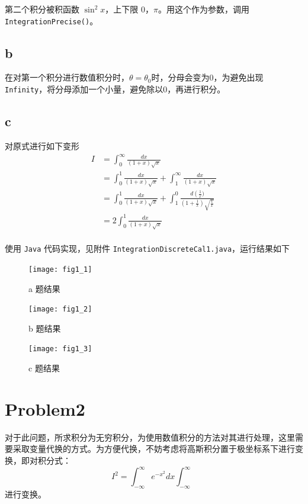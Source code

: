 \documentclass[UTF8]{ctexart}
\begin{document}
    第二个积分被积函数 \(\sin^2{x}\)，上下限 0，\(\pi\)。用这个作为参数，调用 \texttt{IntegrationPrecise()}。

    \subsection{b}\label{subsec:1.2}
    在对第一个积分进行数值积分时，\(\theta = \theta_0\)时，分母会变为0，为避免出现 \texttt{Infinity}，将分母添加一个小量，避免除以0，再进行积分。

    \subsection{c}\label{subsec:1.3}
    对原式进行如下变形
    \begin{equation*}
        \begin{align*}
            I & = \int_{0}^{\infty} \frac{dx}{(1 + x) \sqrt{x}} \\
              & = \int_{0}^{1} \frac{dx}{(1 + x) \sqrt{x}} + \int_{1}^{\infty} \frac{dx}{(1 + x) \sqrt{x}} \\
              & = \int_{0}^{1} \frac{dx}{(1 + x) \sqrt{x}} + \int_{1}^{0} \frac{d\left( \frac{1}{x})}{\left(1 + \frac{1}{x}\right) \sqrt{\frac{1}{x}}} \\
              & = 2 \int_{0}^{1} \frac{dx}{(1 + x) \sqrt{x}} \\
        \end{align*}
    \end{equation*}

    使用 \texttt{Java} 代码实现，见附件 \texttt{IntegrationDiscreteCal1.java}，运行结果如下
    \begin{figure}[h]
        \centering
        \texttt{[image: fig1\_1]}
        \caption{a 题结果}\label{fig:figure1.1}
    \end{figure}
    \begin{figure}[h]
        \centering
        \texttt{[image: fig1\_2]}
        \caption{b 题结果}\label{fig:figure1.2}
    \end{figure}
    \begin{figure}[h]
        \centering
        \texttt{[image: fig1\_3]}
        \caption{c 题结果}\label{fig:figure1.3}
    \end{figure}

    \newpage
    \section{Problem2}\label{sec:section2}
    对于此问题，所求积分为无穷积分，为使用数值积分的方法对其进行处理，这里需要采取变量代换的方式。为方便代换，不妨考虑将高斯积分置于极坐标系下进行变换，即对积分式：
    \begin{equation*}
        I^2 = \int_{-\infty}^{\infty} e^{-x^2} d x \int_{-\infty}^{\infty}
    \end{equation*}
    进行变换。
\end{document}
